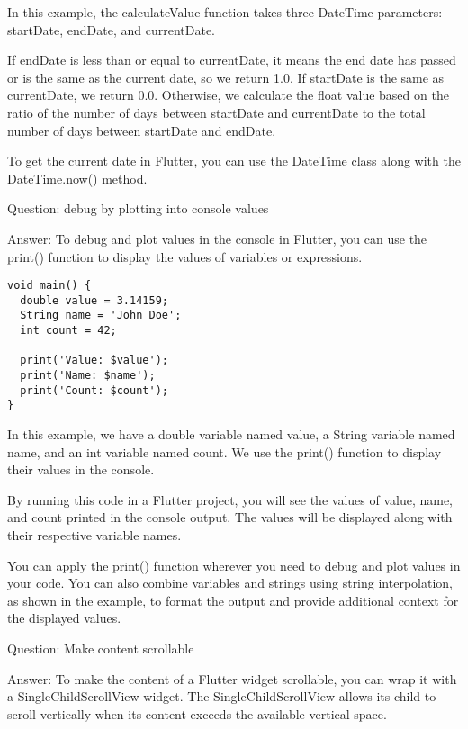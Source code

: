 In this example, the calculateValue function takes three DateTime parameters: startDate, endDate, and currentDate.

If endDate is less than or equal to currentDate, it means the end date has passed or is the same as 
the current date, so we return 1.0.
If startDate is the same as currentDate, we return 0.0.
Otherwise, we calculate the float value based on the ratio of the number of days between startDate and 
currentDate to the total number of days between startDate and endDate.

To get the current date in Flutter, you can use the DateTime class along with the DateTime.now() method. 

Question: debug by plotting into console values

Answer: To debug and plot values in the console in Flutter, you can use the print() function to display 
the values of variables or expressions. 

\begin{lstlisting}
void main() {
  double value = 3.14159;
  String name = 'John Doe';
  int count = 42;

  print('Value: $value');
  print('Name: $name');
  print('Count: $count');
}
\end{lstlisting}

In this example, we have a double variable named value, a String variable named name, and an int variable named count. 
We use the print() function to display their values in the console.

By running this code in a Flutter project, you will see the values of value, name, and count printed in the console 
output. The values will be displayed along with their respective variable names.

You can apply the print() function wherever you need to debug and plot values in your code. You can also combine 
variables and strings using string interpolation, as shown in the example, to format the output and provide 
additional context for the displayed values.


Question: Make content scrollable

Answer: To make the content of a Flutter widget scrollable, you can wrap it with a SingleChildScrollView widget. 
The SingleChildScrollView allows its child to scroll vertically when its content exceeds the available vertical space.

